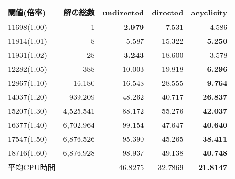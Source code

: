   \begin{tabular}{lr|rrr}
    閾値(倍率)    &	解の総数 & \textsf{undirected} & \textsf{directed} & \textsf{acyclicity} \\
    \hline
    11698(1.00)   &	1      &\textbf{2.979} & 7.531 & 4.586	\\
    11814(1.01)   &	8      &5.587  & 15.322	& \textbf{5.250}	\\
    11931(1.02)   &	28     &\textbf{3.243}& 18.600	& 3.578	\\
    12282(1.05)   &	388    &10.003&19.818	& \textbf{6.296}	\\
    12867(1.10)   &	16,180  &16.548& 28.555	& \textbf{9.764}\\
    14037(1.20)   &	939,209 &48.262       &40.717	& \textbf{26.837}\\
    15207(1.30)   &	4,525,541&88.172      &55.276	& \textbf{42.037}\\
    16377(1.40)   &	6,702,964&99.154       &47.647	& \textbf{40.640}	\\
    17547(1.50)   &	6,876,526&95.390       &45.265	& \textbf{38.411}	\\
    18716(1.60)   &	6,876,928&98.937       &49.138	& \textbf{40.748}	\\
    \hline
    平均CPU時間 &   & 46.8275 & 32.7869  & \textbf{21.8147}\\
  \end{tabular}
